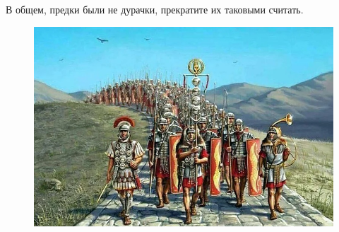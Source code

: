 В общем, предки были не дурачки, прекратите их таковыми считать.

\begin{figure}[h!tb] 
	\centering\includegraphics[scale=0.3]{MakedoskiyShort/1601539180132287292.png}
\end{figure}
